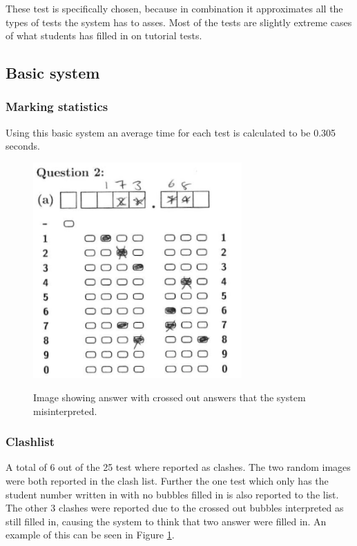 These test is specifically chosen, because in combination it approximates all the types of tests the system has to asses. Most of the tests are slightly extreme cases of what students has filled in on tutorial tests. 

\subsection{Basic system}


\subsubsection{Marking statistics}

Using this basic system an average time for each test is calculated to be 0.305 seconds. 

\begin{figure}
  \centering
  \includegraphics[width=8cm]{crossClash}\\
  \caption{Image showing answer with crossed out answers that the system misinterpreted.}
  \label{fig:crossClash}
\end{figure}

\subsubsection{Clashlist}

A total of 6 out of the 25 test where reported as clashes. The two random images were both reported in the clash list. Further the one test which only has the student number written in with no bubbles filled in is also reported to the list. The other 3 clashes were reported due to the crossed out bubbles interpreted as still filled in, causing the system to think that two answer were filled in. An example of this can be seen in Figure \ref{fig:crossClash}.

